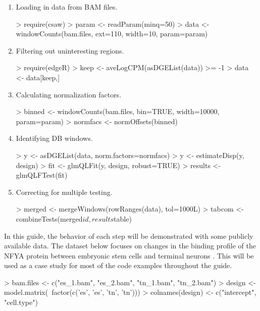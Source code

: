 \documentclass[12pt]{report}
\renewenvironment{Schunk}{\vspace{0pt}}{\vspace{0pt}}
\begin{document}
\begin{enumerate}
\item Loading in data from BAM files.
\begin{Schunk}
\begin{Sinput}
> require(csaw)
> param <- readParam(minq=50)
> data <- windowCounts(bam.files, ext=110, width=10, param=param)
\end{Sinput}
\end{Schunk}
\item Filtering out uninteresting regions.
\begin{Schunk}
\begin{Sinput}
> require(edgeR)
> keep <- aveLogCPM(asDGEList(data)) >= -1
> data <- data[keep,]
\end{Sinput}
\end{Schunk}
\item Calculating normalization factors.
\begin{Schunk}
\begin{Sinput}
> binned <- windowCounts(bam.files, bin=TRUE, width=10000, param=param)
> normfacs <- normOffsets(binned)
\end{Sinput}
\end{Schunk}
\item Identifying DB windows.
\begin{Schunk}
\begin{Sinput}
> y <- asDGEList(data, norm.factors=normfacs)
> y <- estimateDisp(y, design)
> fit <- glmQLFit(y, design, robust=TRUE)
> results <- glmQLFTest(fit)
\end{Sinput}
\end{Schunk}
\item Correcting for multiple testing.
\begin{Schunk}
\begin{Sinput}
> merged <- mergeWindows(rowRanges(data), tol=1000L)
> tabcom <- combineTests(merged$id, results$table)
\end{Sinput}
\end{Schunk}
\end{enumerate}

In this guide, the behavior of each step will be demonstrated with some publicly available data.
The dataset below focuses on changes in the binding profile of the NFYA protein between embryonic stem cells and terminal neurons \citep{tiwari2012}. 
This will be used as a case study for most of the code examples throughout the guide.

\begin{Schunk}
\begin{Sinput}
> bam.files <- c("es_1.bam", "es_2.bam", "tn_1.bam", "tn_2.bam")
> design <- model.matrix(~factor(c('es', 'es', 'tn', 'tn')))
> colnames(design) <- c("intercept", "cell.type")
\end{Sinput}
\end{Schunk}
\label{data:main}
\end{document}
